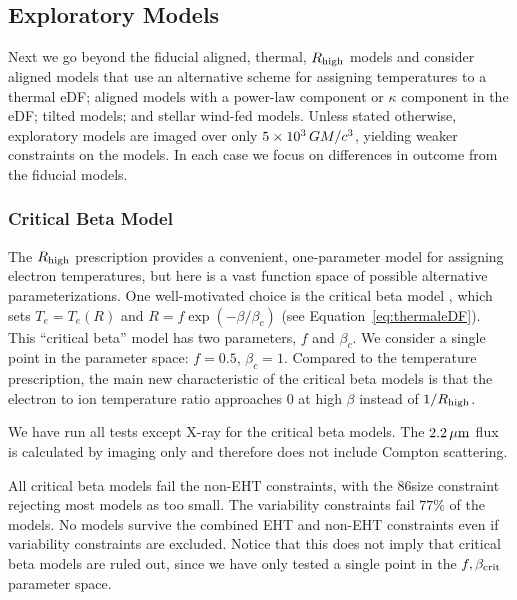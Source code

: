 \subsection{Exploratory Models}\label{sec:explore}

Next we go beyond the fiducial aligned, thermal, $R_\mathrm{high}$ models and consider aligned models that use an alternative scheme for assigning temperatures to a thermal eDF; aligned models with a power-law component or $\kappa$ component in the eDF; tilted models; and stellar wind-fed models.
Unless stated otherwise, exploratory models are imaged over only $5 \times 10^3\,GM/c^3$, yielding weaker constraints on the models.  In each case we focus on differences in outcome from the fiducial models.  

\subsubsection{Critical Beta Model}

The $R_\mathrm{high}$ prescription provides a convenient, one-parameter model for assigning electron temperatures, but here is a vast function space of possible alternative parameterizations.
One well-motivated choice is the critical beta model \citep{2020MNRAS.493.1404A}, which sets $T_e = T_e(R)$ and $R = f \exp(-\beta/\beta_c)$ (see Equation~\ref{eq:thermaleDF}).
This ``critical beta'' model has two parameters, $f$ and $\beta_c$.
We consider a single point in the parameter space: $f = 0.5$, $\beta_c = 1$.
Compared to the \Rh temperature prescription, the main new characteristic of the critical beta models is that the electron to ion temperature ratio approaches 0 at high $\beta$ instead of $1/R_\mathrm{high}$.

We have run all tests except X-ray for the critical beta models.
The $2.2\,\mu\mathrm{m}$ flux is calculated by imaging only and therefore does not include Compton scattering.

All critical beta models fail the non-EHT constraints, with the 86\GHz size constraint rejecting most models as too small.
The variability constraints fail $77\%$ of the models.
No models survive the combined EHT and non-EHT constraints even if variability constraints are excluded.
Notice that this does not imply that critical beta models are ruled out, since we have only tested a single point in the $f,\beta_{\rm crit}$ parameter space.

